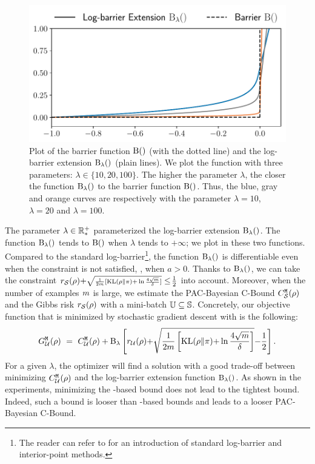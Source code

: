 \begin{figure}
    \centering
    \includegraphics[width=0.8\linewidth]{chapter_4/figures/log_barrier.pdf}
    \caption[]{
    Plot of the barrier function $\operatorname{B}()$ (with the dotted line) and the log-barrier extension $\operatorname{B}_{\lambda}()$ (plain lines).
    We plot the function with three parameters: $\lambda \in \{10, 20, 100\}$.
    The higher the parameter $\lambda$, the closer the function $\operatorname{B}_{\lambda}()$ to the barrier function $\operatorname{B}()$. 
    Thus, the blue, gray and orange curves are respectively with the parameter $\lambda=10$, $\lambda=20$ and $\lambda=100$.
    }
    \label{chap:mv:fig:log_barrier}
\end{figure}

The parameter $\lambda\in\mathbb{R}_{*}^{+}$ parameterized the log-barrier extension $\operatorname{B}_{\lambda}()$.
The function $\operatorname{B}_{\lambda}()$ tends to $\operatorname{B}()$ when $\lambda$ tends to $+\infty$; we plot in  these two functions.
Compared to the standard log-barrier\footnote{The reader can refer to \citet{BoydVandenberghe2014} for an introduction of standard log-barrier and interior-point methods.}, the function $\operatorname{B}_{\lambda}()$ is differentiable even when the constraint is not satisfied, \ie, when $a > 0$.
Thanks to $\operatorname{B}_{\lambda}()$, we can take the constraint $r_{\mathcal{S}}(\rho){+}{\scriptstyle\sqrt{\frac{1}{2m}[ \operatorname{KL}(\rho\|\pi){+}\ln{\scriptscriptstyle\frac{4\sqrt{m}}{\delta}}]}}\le\!\tfrac{1}{2}$ into account.
Moreover, when the number of examples $m$ is large, we estimate the PAC-Bayesian C-Bound ${C}^{\tt M}_{\mathcal{S}}(\rho)$ and the Gibbs risk $r_{\mathcal{S}}(\rho)$ with a mini-batch $\mathbb{U}\subseteq\mathbb{S}$.
Concretely, our objective function that is minimized by stochastic gradient descent with  is the following:
\begin{align*}
   G^{\tt M}_{\mathcal{U}}(\rho) \ =\ {C}^{\tt M}_{\mathcal{U}}(\rho) + \operatorname{B}_{\lambda}\left[ r_{\mathcal{U}}(\rho){+}\sqrt{\frac{1}{2m}\left[ \operatorname{KL}(\rho\|\pi){+}\ln\frac{4\sqrt{m}}{\delta}\right]}{-}\frac{1}{2}\right].
\end{align*}
For a given $\lambda$, the optimizer will find a solution with a good trade-off between minimizing ${C}^{\tt M}_{\mathcal{U}}(\rho)$ and the log-barrier extension function $\operatorname{B}_{\lambda}()$.
As shown in the experiments, minimizing the \citeauthor{McAllester2003}-based bound does not lead to the tightest bound.
Indeed, such a bound is looser than \citeauthor{Seeger2002}-based bounds and leads to a looser PAC-Bayesian C-Bound. 
